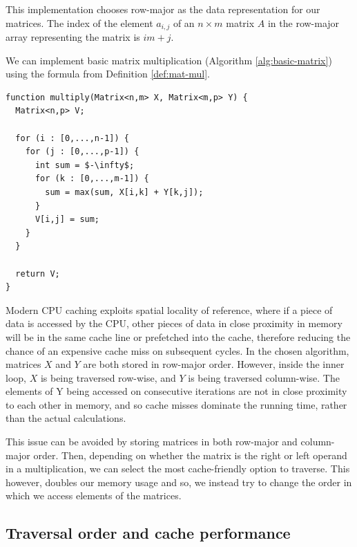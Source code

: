This implementation chooses row-major as the data representation for our matrices. The index of the element $a_{i,j}$ of
an $n\times m$ matrix $A$ in the row-major array representing the matrix is $im + j$.

We can implement basic matrix multiplication (Algorithm \ref{alg:basic-matrix}) using the formula from Definition \ref{def:mat-mul}.

\begin{algfloat}[ht]
\begin{lstlisting}[mathescape=true]
function multiply(Matrix<n,m> X, Matrix<m,p> Y) {
  Matrix<n,p> V;

  for (i : [0,...,n-1]) {
    for (j : [0,...,p-1]) {
      int sum = $-\infty$;
      for (k : [0,...,m-1]) {
        sum = max(sum, X[i,k] + Y[k,j]);
      }
      V[i,j] = sum;
    }
  }

  return V;
}
\end{lstlisting}
\caption{Basic matrix multiplication algorithm.}
\label{alg:basic-matrix}
\end{algfloat}


Modern CPU caching exploits spatial locality of reference, where if a piece of data is accessed by the CPU, other pieces
of data in close proximity in memory will be in the same cache line or prefetched into the cache, therefore reducing the
chance of an expensive cache miss on subsequent cycles.
In the chosen algorithm, matrices $X$ and $Y$ are both stored in row-major order. However, inside the inner loop, $X$ is
being traversed row-wise, and $Y$ is being traversed column-wise. The elements of Y being accessed on consecutive
iterations are not in close proximity to each other in memory, and so cache misses dominate the running time, rather
than the actual calculations.

This issue can be avoided by storing matrices in both row-major and column-major order. Then, depending on whether the
matrix is the right or left operand in a multiplication, we can select the most cache-friendly option to traverse.
This however, doubles our memory usage and so, we instead try to change the order in which we access elements of the matrices.

\subsection{Traversal order and cache performance} \label{impl:traversal-order}

